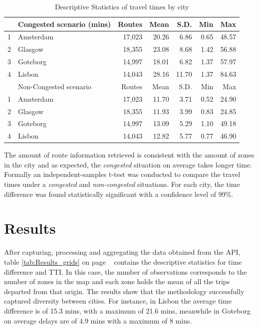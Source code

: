 \documentclass[a4paper]{jpconf}
\begin{document}
\begin{table}[ht]		
	\centering
	\begin{tabular}{rlrrrrr}
		\hline
		& Congested scenario (mins) & Routes & Mean & S.D. & Min & Max 	   \\ 
		\hline
		1 & Amsterdam 	& 17,023 & 20.26 & 6.86 	& 0.65 & 48.57 		   \\ 
		2 & Glasgow 	& 18,355 & 23.08 & 8.68 	& 1.42 & 56.88 		   \\ 
		3 & Goteborg 	& 14,997 & 18.01 & 6.82 	& 1.37 & 57.97 	       \\ 
		4 & Lisbon 		& 14,043 & 28.16 & 11.70 	& 1.37 & 84.63 	       \\ 
		
		\hline
		& Non-Congested scenario & Routes & Mean & S.D. & Min & Max    \\ 
		\hline
		1 & Amsterdam	& 17,023 & 11.70 & 3.71 & 0.52 & 24.90 	       \\ 
		2 & Glasgow 	& 18,355 & 11.93 & 3.99 & 0.83 & 24.85 	       \\ 
		3 & Goteborg 	& 14,997 & 13.09 & 5.29 & 1.10 & 49.18 	       \\ 
		4 & Lisbon 		& 14,043 & 12.82 & 5.77 & 0.77 & 46.90         \\ 
		\hline
	\end{tabular}
	\caption {Descriptive Statistics of travel times by city}
	\label{tab:Results_routes}
\end{table}

\indent The amount of route information retrieved is consistent with the amount of zones in the city and as expected, the \textit{congested} situation on average takes longer time. Formally an independent-samples t-test was conducted to compare the travel times under a \textit{congested} and \textit{non-congested} situations. For each city, the time difference was found statistically significant with a confidence level of 99\%.

\section{Results} %
After capturing, processing and aggregating the data obtained from the API, table \ref{tab:Results_grids} on page ~\pageref{tab:Results_grids} contains the descriptive statistics for time difference and TTI. In this case, the number of observations corresponds to the number of zones in the map and each zone holds the mean of all the trips departed from that origin. 
\indent The results show that the methodology successfully captured diversity between cities. For instance, in Lisbon the average time difference is of 15.3 mins, with a maximum of 21.6 mins, meanwhile in Goteborg on average delays are of 4.9 mins with a maximum of 8 mins.  
\end{document}
